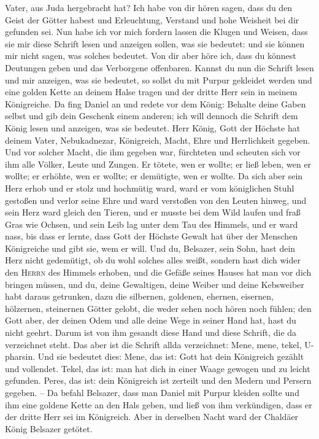 Vater, aus Juda hergebracht hat?  Ich habe von dir hören
sagen, dass du den Geist der Götter habest und Erleuchtung, Verstand und
hohe Weisheit bei dir gefunden sei.  Nun habe ich vor
mich fordern lassen die Klugen und Weisen, dass sie mir diese Schrift
lesen und anzeigen sollen, was sie bedeutet: und sie können mir nicht
sagen, was solches bedeutet.  Von dir aber höre ich, dass
du könnest Deutungen geben und das Verborgene offenbaren. Kannst du nun
die Schrift lesen und mir anzeigen, was sie bedeutet, so sollst du mit
Purpur gekleidet werden und eine golden Kette an deinem Halse tragen und
der dritte Herr sein in meinem Königreiche.  Da fing
Daniel an und redete vor dem König: Behalte deine Gaben selbst und gib
dein Geschenk einem anderen; ich will dennoch die Schrift dem König
lesen und anzeigen, was sie bedeutet.  Herr König, Gott
der Höchste hat deinem Vater, Nebukadnezar, Königreich, Macht, Ehre und
Herrlichkeit gegeben.  Und vor solcher Macht, die ihm
gegeben war, fürchteten und scheuten sich vor ihm alle Völker, Leute und
Zungen. Er tötete, wen er wollte; er ließ leben, wen er wollte; er
erhöhte, wen er wollte; er demütigte, wen er wollte.  Da
sich aber sein Herz erhob und er stolz und hochmütig ward, ward er vom
königlichen Stuhl gestoßen und verlor seine Ehre  und
ward verstoßen von den Leuten hinweg, und sein Herz ward gleich den
Tieren, und er musste bei dem Wild laufen und fraß Gras wie Ochsen, und
sein Leib lag unter dem Tau des Himmels, und er ward nass, bis dass er
lernte, dass Gott der Höchste Gewalt hat über der Menschen Königreiche
und gibt sie, wem er will.  Und du, Belsazer, sein Sohn,
hast dein Herz nicht gedemütigt, ob du wohl solches alles weißt,
 sondern hast dich wider den \textsc{Herrn} des Himmels
erhoben, und die Gefäße seines Hauses hat man vor dich bringen müssen,
und du, deine Gewaltigen, deine Weiber und deine Kebsweiber habt daraus
getrunken, dazu die silbernen, goldenen, ehernen, eisernen, hölzernen,
steinernen Götter gelobt, die weder sehen noch hören noch fühlen; den
Gott aber, der deinen Odem und alle deine Wege in seiner Hand hat, hast
du nicht geehrt.  Darum ist von ihm gesandt diese Hand
und diese Schrift, die da verzeichnet steht.  Das aber
ist die Schrift allda verzeichnet: Mene, mene, tekel, U-pharsin.
 Und sie bedeutet dies: Mene, das ist: Gott hat dein
Königreich gezählt und vollendet.  Tekel, das ist: man
hat dich in einer Waage gewogen und zu leicht gefunden. 
Peres, das ist: dein Königreich ist zerteilt und den Medern und Persern
gegeben. --  Da befahl Belsazer, dass man Daniel mit
Purpur kleiden sollte und ihm eine goldene Kette an den Hals geben, und
ließ von ihm verkündigen, dass er der dritte Herr sei im Königreich.
 Aber in derselben Nacht ward der Chaldäer König Belsazer
getötet.

